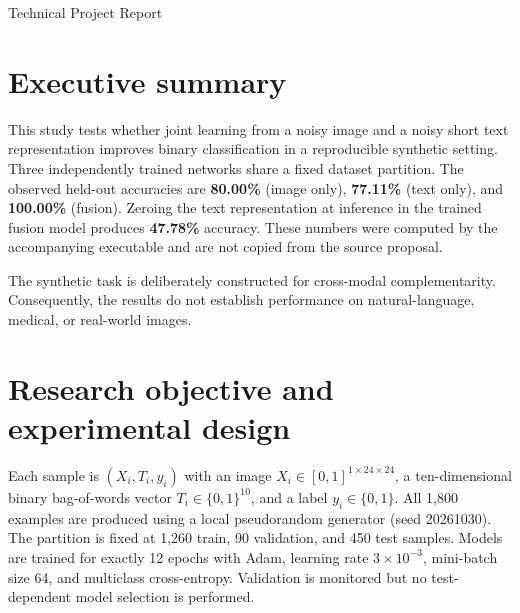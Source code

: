\documentclass[11pt,a4paper]{article}
\begin{document}
\begin{titlepage}\centering{}\vspace{9mm}{\Large Reproducible Image--Text Classification\par}\vspace{8mm}{\large A controlled synthetic benchmark and technical evaluation\par}\vfill{\large Technical Project Report\par}\vspace{5mm}{\large October 2026\par}\vspace{20mm}{\small Dataset: 1,800 generated paired samples \quad | \quad 24$\times$24 images \quad | \quad 10 text features\par}\end{titlepage}
\tableofcontents\clearpage
\section{Executive summary}
This study tests whether joint learning from a noisy image and a noisy short text representation improves binary classification in a reproducible synthetic setting. Three independently trained networks share a fixed dataset partition. The observed held-out accuracies are \textbf{80.00\%} (image only), \textbf{77.11\%} (text only), and \textbf{100.00\%} (fusion). Zeroing the text representation at inference in the trained fusion model produces \textbf{47.78\%} accuracy. These numbers were computed by the accompanying executable and are not copied from the source proposal.

The synthetic task is deliberately constructed for cross-modal complementarity. Consequently, the results do not establish performance on natural-language, medical, or real-world images.
\section{Research objective and experimental design}
Each sample is $(X_i,T_i,y_i)$ with an image $X_i\in[0,1]^{1\times24\times24}$, a ten-dimensional binary bag-of-words vector $T_i\in\{0,1\}^{10}$, and a label $y_i\in\{0,1\}$. All 1,800 examples are produced using a local pseudorandom generator (seed 20261030). The partition is fixed at 1,260 train, 90 validation, and 450 test samples. Models are trained for exactly 12 epochs with Adam, learning rate $3\times10^{-3}$, mini-batch size 64, and multiclass cross-entropy. Validation is monitored but no test-dependent model selection is performed.
\end{document}

